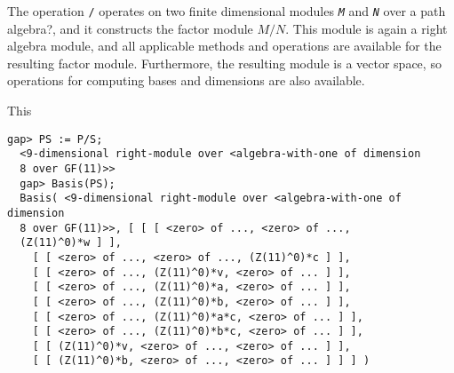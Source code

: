 \documentclass[a4paper,11pt]{report}
\begin{document}
{{{ The operation \texttt{/} operates on two finite dimensional modules \mbox{\texttt{\slshape M}} and \mbox{\texttt{\slshape N}} over a path algebra?, and it constructs the factor module $M/N$. This module is again a right algebra module, and all applicable methods and
operations are available for the resulting factor module. Furthermore, the
resulting module is a vector space, so operations for computing bases and
dimensions are also available. }

 This 
\begin{Verbatim}[fontsize=\small,frame=single,label=Example]
  gap> PS := P/S;
  <9-dimensional right-module over <algebra-with-one of dimension
  8 over GF(11)>> 
  gap> Basis(PS);
  Basis( <9-dimensional right-module over <algebra-with-one of dimension 
  8 over GF(11)>>, [ [ [ <zero> of ..., <zero> of ...,
  (Z(11)^0)*w ] ],  
    [ [ <zero> of ..., <zero> of ..., (Z(11)^0)*c ] ], 
    [ [ <zero> of ..., (Z(11)^0)*v, <zero> of ... ] ], 
    [ [ <zero> of ..., (Z(11)^0)*a, <zero> of ... ] ], 
    [ [ <zero> of ..., (Z(11)^0)*b, <zero> of ... ] ], 
    [ [ <zero> of ..., (Z(11)^0)*a*c, <zero> of ... ] ], 
    [ [ <zero> of ..., (Z(11)^0)*b*c, <zero> of ... ] ], 
    [ [ (Z(11)^0)*v, <zero> of ..., <zero> of ... ] ], 
    [ [ (Z(11)^0)*b, <zero> of ..., <zero> of ... ] ] ] )
\end{Verbatim}
 }

 }

 
\end{document}
